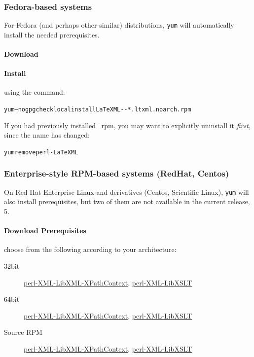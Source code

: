 \documentclass{article}
\begin{document}
\subsubsection[Fedora-based systems]{Fedora-based systems}\label{install.fedora}
For Fedora (and perhaps other similar) distributions, \texttt{yum} will automatically install
the needed prerequisites.
\paragraph{Download} \CurrentFedora
\paragraph{Install} using the command:
\begin{alltt}
   yum --nogpgcheck localinstall LaTeXML-\CurrentVersion-*.ltxml.noarch.rpm
\end{alltt}
If you had previously installed \LaTeXML\ rpm, you may want to explicitly
uninstall it \emph{first}, since the name has changed:
\begin{alltt}
   yum remove perl-LaTeXML
\end{alltt}

\subsubsection[Enterprise systems]{Enterprise-style RPM-based systems (RedHat, Centos)}\label{install.enterprise}
On Red Hat Enterprise Linux and derivatives (Centos, Scientific Linux), \texttt{yum} will also
install prerequisites, but two of them are not available in the current release, 5.
\paragraph{Download Prerequisites} choose from the following according to your architecture:
\begin{description}
\item[32bit]
   \href{releases/perl-XML-LibXML-XPathContext-0.07-1.c5.ltxml.i386.rpm}{perl-XML-LibXML-XPathContext},
   \href{releases/perl-XML-LibXSLT-1.58-1.c5.ltxml.i386.rpm}{perl-XML-LibXSLT}
\item[64bit]
   \href{releases/perl-XML-LibXML-XPathContext-0.07-1.c5.ltxml.x86_64.rpm}{perl-XML-LibXML-XPathContext},
   \href{releases/perl-XML-LibXSLT-1.58-1.c5.ltxml.x86_64.rpm}{perl-XML-LibXSLT}
\item[Source RPM]
    \href{releases/perl-XML-LibXML-XPathContext-0.07-1.c5.ltxml.src.rpm}{perl-XML-LibXML-XPathContext},
    \href{releases/perl-XML-LibXSLT-1.58-1.c5.ltxml.src.rpm}{perl-XML-LibXSLT}
\end{description}
\end{document}
